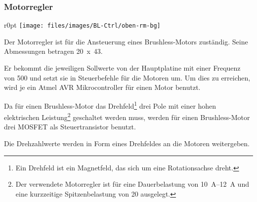 \subsubsection{Motorregler}
\begin{wrapfigure}{r}{0pt}
	\texttt{[image: files/images/BL-Ctrl/oben-rm-bg]}
\end{wrapfigure}

Der Motorregler ist für die Ansteuerung eines Brushless-Motors zuständig.
Seine Abmessungen betragen \unit{20 x 43}{\milli\metre}.

Er bekommt die jeweiligen Sollwerte von der Hauptplatine
mit einer Frequenz von \unit{500}{\hertz}
und setzt sie in Steuerbefehle für die Motoren um.
Um dies zu erreichen, wird je ein Atmel AVR Mikrocontroller für einen Motor benutzt.

Da für einen Brushless-Motor das Drehfeld\footnote{Ein Drehfeld
ist ein Magnetfeld, das sich um eine Rotationsachse dreht.}
drei Pole mit einer hohen elektrischen Leistung\footnote{Der verwendete Motorregler
ist für eine Dauerbelastung von \SIrange{10}{12}{\ampere}
und eine kurzzeitige Spitzenbelastung von \unit{20}{\ampere} ausgelegt.}
geschaltet werden muss, werden für einen Brushless-Motor drei \ac{MOSFET} als Steuertransistor benutzt.

Die Drehzahlwerte werden in Form eines Drehfeldes an die Motoren weitergeben.
